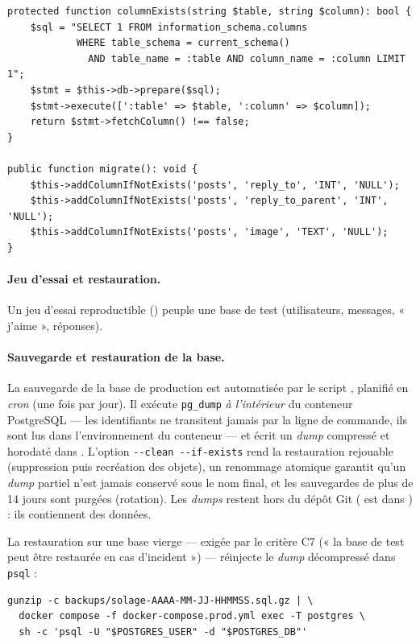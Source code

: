 \begin{lstlisting}[style=php, caption={Migration idempotente — \file{src/Migrations.php}}]
protected function columnExists(string $table, string $column): bool {
    $sql = "SELECT 1 FROM information_schema.columns
            WHERE table_schema = current_schema()
              AND table_name = :table AND column_name = :column LIMIT 1";
    $stmt = $this->db->prepare($sql);
    $stmt->execute([':table' => $table, ':column' => $column]);
    return $stmt->fetchColumn() !== false;
}

public function migrate(): void {
    $this->addColumnIfNotExists('posts', 'reply_to', 'INT', 'NULL');
    $this->addColumnIfNotExists('posts', 'reply_to_parent', 'INT', 'NULL');
    $this->addColumnIfNotExists('posts', 'image', 'TEXT', 'NULL');
}
\end{lstlisting}

\paragraph{Jeu d'essai et restauration.} Un jeu d'essai reproductible
() peuple une base de test (utilisateurs, messages, « j'aime », réponses).

\paragraph{Sauvegarde et restauration de la base.} La sauvegarde de la base de production est
automatisée par le script , planifié en \emph{cron} (une fois par jour).
Il exécute \texttt{pg\_dump} \emph{à l'intérieur} du conteneur PostgreSQL — les identifiants ne
transitent jamais par la ligne de commande, ils sont lus dans l'environnement du conteneur — et
écrit un \emph{dump} compressé et horodaté dans . L'option
\texttt{-{}-clean -{}-if-exists} rend la restauration rejouable (suppression puis recréation des
objets), un renommage atomique garantit qu'un \emph{dump} partiel n'est jamais conservé sous le
nom final, et les sauvegardes de plus de 14 jours sont purgées (rotation). Les \emph{dumps}
restent hors du dépôt Git ( est dans ) : ils contiennent des
données.

La restauration sur une base vierge — exigée par le critère C7 (« la base de test peut être
restaurée en cas d'incident ») — réinjecte le \emph{dump} décompressé dans \texttt{psql} :

\begin{lstlisting}[style=bash, caption={Restauration d'un \emph{dump} compressé dans le conteneur}]
gunzip -c backups/solage-AAAA-MM-JJ-HHMMSS.sql.gz | \
  docker compose -f docker-compose.prod.yml exec -T postgres \
  sh -c 'psql -U "$POSTGRES_USER" -d "$POSTGRES_DB"'
\end{lstlisting}

